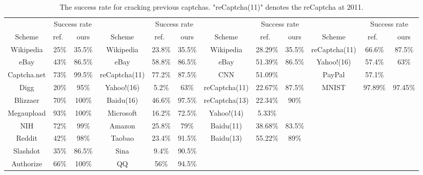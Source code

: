 \begin{table}[t]
    \centering
    \caption{The success rate for cracking previous captchas. "reCaptcha(11)" denotes the reCaptcha at 2011.}
    \label{table: previous_rate}
    \scriptsize
    \begin{tabular}{|c|c|c|c|c|c|c|c|c|c|c|c|}
        \hline
        & \multicolumn{2}{|c|}{Success rate}& & \multicolumn{2}{|c|}{Success rate} & &\multicolumn{2}{|c|}{Success rate} & & \multicolumn{2}{|c|}{Success rate}\\
        \cline{2-3} \cline{5-6} \cline{8-9} \cline{11-12}
        \multirow{-2}{*}{Scheme} & ref.~\cite{Bursztein2011Text} & ours & \multirow{-2}{*}{Scheme} & ref.~\cite{Gao2016A} & ours & \multirow{-2}{*}{Scheme} & ref.~\cite{Bursztein2014The} & ours & \multirow{-2}{*}{Scheme} & ref.~\cite{George2017A} & ours \\
        \hline
        Wikipedia & 25\% & 35.5\% & Wikipedia & 23.8\% & 35.5\% & Wikipedia & 28.29\% & 35.5\% & reCaptcha(11) & 66.6\% & 87.5\% \\
        \hline
        eBay & 43\% & 86.5\% & eBay & 58.8\% & 86.5\% & eBay & 51.39\% & 86.5\% & Yahoo!(16) & 57.4\% & 63\% \\
        \hline
        Captcha.net & 73\% & 99.5\% & reCaptcha(11) & 77.2\% & 87.5\% & CNN & 51.09\% &  & PayPal & 57.1\% & \\
        \hline
        Digg & 20\% & 95\% & Yahoo!(16) & 5.2\% & 63\% & reCaptcha(11) & 22.67\% & 87.5\% & MNIST & 97.89\% & 97.45\% \\
        \hline
        Blizzaer & 70\% & 100\% & Baidu(16) & 46.6\% & 97.5\% & reCaptcha(13) & 22.34\% & 90\% & & &\\
        \hline
        Megaupload & 93\% & 100\% & Microsoft & 16.2\% & 72.5\% & Yahoo!(14) & 5.33\% &  & & & \\
        \hline
        NIH & 72\% & 99\% & Amazon & 25.8\% & 79\% & Baidu(11) & 38.68\% & 83.5\% & & & \\
        \hline
        Reddit & 42\% & 98\% & Taobao & 23.4\% & 91.5\% & Baidu(13) & 55.22\% & 89\% & & &  \\
        \hline
        Slashdot & 35\% & 86.5\% & Sina & 9.4\% & 90.5\% & & & & & & \\
        \hline
        Authorize & 66\% & 100\% & QQ & 56\% & 94.5\% & & & & & & \\
        \hline
    \end{tabular}
\end{table}

